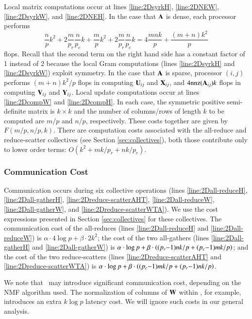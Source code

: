 Local matrix computations occur at lines \ref{line:2DsyrkH}, \ref{line:2DNEW}, \ref{line:2DsyrkW}, and \ref{line:2DNEH}.
In the case that $\AA$ is dense, each processor performs 
$$\frac np k^2+2\frac{m}{p_r}\frac{n}{p_c}k+\frac mp k^2+2\frac{m}{p_r}\frac{n}{p_c}k=4\frac{mnk}{p}+\frac{(m+n)k^2}{p}$$
flops. 
Recall that the second term on the right hand side has a constant factor of 1 instead of 2 because the local Gram computations (lines \ref{line:2DsyrkH} and \ref{line:2DsyrkW}) exploit symmetry.
In the case that $\AA$ is sparse, processor $(i,j)$ performs $(m+n)k^2/p$ flops in computing $\M{U}_{ij}$ and $\M{X}_{ij}$, and $4\nnz(\AA_{ij})k$ flops in computing $\M{V}_{ij}$ and $\M{Y}_{ij}$.
Local update computations occur at lines \ref{line:2DcompW} and \ref{line:2DcompH}.
In each case, the symmetric positive semi-definite matrix is $k\times k$ and the number of columns/rows of length $k$ to be computed are $m/p$ and $n/p$, respectively.
These costs together are given by $F(m/p,n/p,k)$.
There are computation costs associated with the all-reduce and reduce-scatter collectives (see Section \ref{sec:collectives}), both those contribute only to lower order terms: $O(k^2+mk/p_r+nk/p_c)$.

\subsubsection{Communication Cost}
\label{sec:alg:comm}

Communication occurs during six collective operations (lines \ref{line:2Dall-reduceH}, \ref{line:2Dall-gatherH}, \ref{line:2Dreduce-scatterAHT}, \ref{line:2Dall-reduceW}, \ref{line:2Dall-gatherW}, and \ref{line:2Dreduce-scatterWTA}).
We use the cost expressions presented in Section \ref{sec:collectives} for these collectives.
The communication cost of the all-reduces (lines \ref{line:2Dall-reduceH} and \ref{line:2Dall-reduceW}) is $\alpha \cdot 4\log p+\beta \cdot 2k^2$; 
the cost of the two all-gathers (lines \ref{line:2Dall-gatherH} and \ref{line:2Dall-gatherW}) is $\alpha \cdot \log p + \beta \cdot \lt( (p_r{-}1)nk/p + (p_c{-}1)mk/p\rt)$; and
the cost of the two reduce-scatters (lines \ref{line:2Dreduce-scatterAHT} and  \ref{line:2Dreduce-scatterWTA}) is $\alpha \cdot \log p + \beta \cdot \lt( (p_c{-}1)mk/p + (p_r{-}1)nk/p\rt)$.

We note that \LUC\ may introduce significant communication cost, depending on the NMF algorithm used.
The normalization of columns of $\WW$ within \HALS, for example, introduces an extra $k\log p$ latency cost.
We will ignore such costs in our general analysis.

